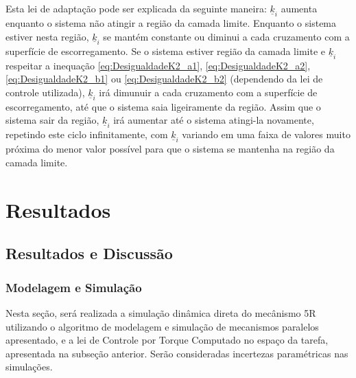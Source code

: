 \documentclass[]{politex}
\begin{document}
Esta lei de adaptação pode ser explicada da seguinte maneira: $\underline{k}_i$ aumenta enquanto o sistema não atingir a região da camada limite. Enquanto o sistema estiver nesta região, $\underline{k}_i$ se mantém constante ou diminui a cada cruzamento com a superfície de escorregamento. Se o sistema estiver região da camada limite e $\underline{k}_i$ respeitar a inequação \eqref{eq:DesigualdadeK2_a1}, \eqref{eq:DesigualdadeK2_a2}, \eqref{eq:DesigualdadeK2_b1} ou \eqref{eq:DesigualdadeK2_b2} (dependendo da lei de controle utilizada), $\underline{k}_i$ irá dimunuir a cada cruzamento com a superfície de escorregamento, até que o sistema saia ligeiramente da região. Assim que o sistema sair da região, $\underline{k}_i$ irá aumentar até o sistema atingi-la novamente, repetindo este ciclo infinitamente, com $\underline{k}_i$ variando em uma faixa de valores muito próxima do menor valor possível para que o sistema se mantenha na região da camada limite.

\part{Resultados}

\chapter{Resultados e Discussão}


\section{Modelagem e Simulação}

Nesta seção, será realizada a simulação dinâmica direta do mecânismo 5R utilizando o algoritmo de modelagem e simulação de mecanismos paralelos apresentado, e a lei de Controle por Torque Computado no espaço da tarefa, apresentada na subseção anterior. Serão consideradas incertezas paramétricas nas simulações.
\end{document}
